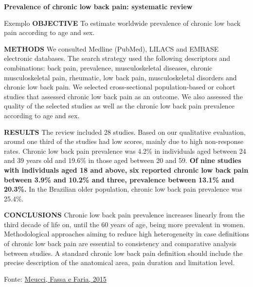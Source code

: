 \documentclass{beamer}
\begin{document}
\begin{frame}{\tiny \bf Prevalence of chronic low back pain: systematic review}
  \begin{exampleblock}{Exemplo}
    \tiny
{\bf OBJECTIVE}
To estimate worldwide prevalence of chronic low back pain according to age and sex.

{\bf METHODS}
We consulted Medline (PubMed), LILACS and EMBASE electronic databases.
The search strategy used the following descriptors and combinations: back pain, prevalence, musculoskeletal diseases, chronic musculoskeletal pain, rheumatic, low back pain, musculoskeletal disorders and chronic low back pain.
We selected cross-sectional population-based or cohort studies that assessed chronic low back pain as an outcome.
We also assessed the quality of the selected studies as well as the chronic low back pain prevalence according to age and sex.

{\bf RESULTS}
The review included 28 studies.
  Based on our qualitative evaluation, around one third of the studies had low scores, mainly due to high non-response rates.
Chronic low back pain prevalence was 4.2\% in individuals aged between 24 and 39 years old and 19.6\% in those aged between 20 and 59.
\alert{\bf \scriptsize Of nine studies with individuals aged 18 and above, six reported chronic low back pain between 3.9\% and 10.2\% and three, prevalence between 13.1\% and 20.3\%.}
In the Brazilian older population, chronic low back pain prevalence was 25.4\%.

{\bf CONCLUSIONS}
Chronic low back pain prevalence increases linearly from the third decade of life on, until the 60 years of age, being more prevalent in women. Methodological approaches aiming to reduce high heterogeneity in case definitions of chronic low back pain are essential to consistency and comparative analysis between studies. A standard chronic low back pain definition should include the precise description of the anatomical area, pain duration and limitation level.
  \end{exampleblock}

  \vfill
  \scriptsize
  \hfill Fonte: \href{https://doi.org/10.1590/S0034-8910.2015049005874}
  {Meucci, Fassa e Faria, 2015}
\end{frame}
\end{document}
